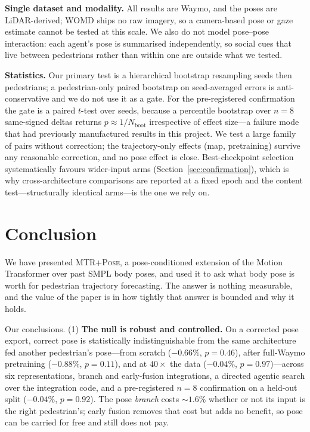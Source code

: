 \documentclass{article} %
\newcommand{\mtrpose}{\textsc{MTR+Pose}\xspace}
\begin{document}
\textbf{Single dataset and modality.} All results are Waymo, and the poses are
LiDAR-derived; WOMD ships no raw imagery, so a camera-based pose or gaze estimate
cannot be tested at this scale. We also do not model pose--pose interaction: each
agent's pose is summarised independently, so social cues that live between
pedestrians rather than within one are outside what we tested.

\textbf{Statistics.} Our primary test is a hierarchical bootstrap resampling seeds
then pedestrians; a pedestrian-only paired bootstrap on seed-averaged errors is
anti-conservative and we do not use it as a gate. For the pre-registered
confirmation the gate is a paired $t$-test over seeds, because a percentile
bootstrap over $n{=}8$ same-signed deltas returns $p\approx1/N_{\text{boot}}$
irrespective of effect size---a failure mode that had previously manufactured
results in this project. We test a large family of pairs without correction; the
trajectory-only effects (map, pretraining) survive any reasonable correction,
and no pose effect is close. Best-checkpoint selection systematically favours
wider-input arms (Section~\ref{sec:confirmation}), which is why cross-architecture
comparisons are reported at a fixed epoch and the content test---structurally
identical arms---is the one we rely on.

\section{Conclusion}
\label{sec:conclusion}

We have presented \mtrpose, a pose-conditioned extension of the Motion
Transformer over past SMPL body poses, and used it to ask what body pose is worth
for pedestrian trajectory forecasting. The answer is nothing measurable, and the
value of the paper is in how tightly that answer is bounded and why it holds.

Our conclusions. (1) \textbf{The null is robust and controlled.} On a corrected
pose export, correct pose is statistically indistinguishable from the same
architecture fed another pedestrian's pose---from scratch ($-0.66\%$, $p{=}0.46$),
after full-Waymo pretraining ($-0.88\%$, $p{=}0.11$), and at $40\times$ the data
($-0.04\%$, $p{=}0.97$)---across six representations, branch and early-fusion
integrations, a directed agentic search over the integration code, and a
pre-registered $n{=}8$ confirmation on a held-out split ($-0.04\%$, $p{=}0.92$).
The pose \emph{branch} costs ${\sim}1.6\%$ whether or not its input is the right
pedestrian's; early fusion removes that cost but adds no benefit, so pose can be
carried for free and still does not pay.
\end{document}
